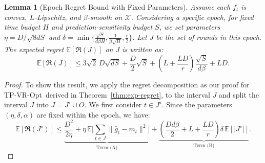 \documentclass[journal,onecolumn]{IEEEtran}
\newcommand{\cX}{\mathcal{X}}
\theoremstyle{plain}
\newtheorem{lemma}[theorem]{Lemma}
\theoremstyle{definition}
\theoremstyle{remark}
\newcommand{\regret}{\mathfrak{R}}
\newcommand{\tpvr}{{\sc TP-VR-Opt}}
\begin{document}
{

\begin{lemma}[Epoch Regret Bound with Fixed Parameters]
    \label{lem:epoch-regret-anytime} Assume each $f_{t}$ is convex, $L$-Lipschitz,
    and $\beta$-smooth on $\cX$.  Considering a specific epoch, for fixed time budget $H$ and prediction-sensitivity budget $S$, we set parameters $\eta=D/\sqrt{8dS}$ and $\delta
    =\min\{\frac{\sqrt{S}}{d\beta H},\frac{1}{\beta\sqrt{H}},\frac{r}{2}\}$. Let
    $J$ be the set of rounds in this epoch. The expected regret $\mathbb{E}[\regret(J)]$ on $J$
    is written as:
    \begin{equation*}
        \mathbb{E}[\regret(J)] \le 3\sqrt{2}\,D\sqrt{dS}+\frac{D}{2}\sqrt{S}+ \left(L+\frac{LD}{r}\right)\frac{\sqrt{S}}{d\beta}+LD.
    \end{equation*}
\end{lemma}

\begin{proof}
    To show this result, we apply the regret decomposition as our proof for \tpvr\, derived in Theorem~\ref{thm:exp-regret},
    to the interval $J$ and split the interval $J$ into $J=J^{\circ}\cup O$. We first consider $t\in J^{\circ}$. Since the parameters $(\eta,\delta,\alpha)$ are
    fixed within the epoch, we have:
    \begin{equation}
        \mathbb{E}[\regret(J^{\circ})]\le \underbrace{\frac{D^{2}}{2\eta} + \eta\,\mathbb{E}\bigg[\sum_{t\in J}\|\hat
        g_t-m_t\|^2\bigg]}_{\text{Term (A)}}+\underbrace{\left( \frac{Dd\beta}{2}
        + L + \frac{LD}{r} \right) \delta\,\mathbb{E}[|J^{\circ}|]}_{\text{Term (B)}}.
    \end{equation}


\end{proof}}
\end{document}
